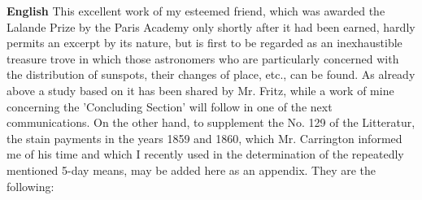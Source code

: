 \documentclass[12pt]{article}
\begin{document}
\textbf{English}
This excellent work of my esteemed friend, which was awarded the Lalande Prize by the Paris Academy only shortly after it had been earned, hardly permits an excerpt by its nature, but is first to be regarded as an inexhaustible treasure trove in which those astronomers who are particularly concerned with the distribution of sunspots, their changes of place, etc., can be found. As already above a study based on it has been shared by Mr. Fritz, while a work of mine concerning the 'Concluding Section' will follow in one of the next communications. On the other hand, to supplement the No. 129 of the Litteratur, the stain payments in the years 1859 and 1860, which Mr. Carrington informed me of his time and which I recently used in the determination of the repeatedly mentioned 5-day means, may be added here as an appendix. They are the following:
\end{document}
